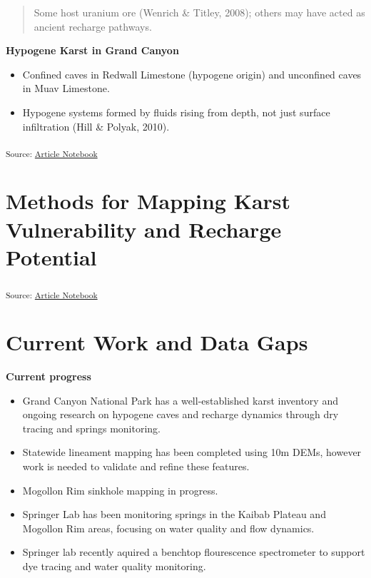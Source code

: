 \documentclass[
]{agujournal2019}
\begin{document}
\begin{quote}
Some host uranium ore (Wenrich \& Titley, 2008); others may have acted
as ancient recharge pathways.
\end{quote}

\textbf{Hypogene Karst in Grand Canyon}

\begin{itemize}
\item
  Confined caves in Redwall Limestone (hypogene origin) and unconfined
  caves in Muav Limestone.
\item
  Hypogene systems formed by fluids rising from depth, not just surface
  infiltration (Hill \& Polyak, 2010).
\end{itemize}

\textsubscript{Source:
\href{https://Ryan3Lima.github.io/ATUR-KARST/index.ipynb.html}{Article
Notebook}}

\section{Methods for Mapping Karst Vulnerability and Recharge
Potential}\label{methods-for-mapping-karst-vulnerability-and-recharge-potential}

\textsubscript{Source:
\href{https://Ryan3Lima.github.io/ATUR-KARST/index.ipynb.html}{Article
Notebook}}

\section{Current Work and Data Gaps}\label{current-work-and-data-gaps}

\textbf{Current progress}

\begin{itemize}
\item
  Grand Canyon National Park has a well-established karst inventory and
  ongoing research on hypogene caves and recharge dynamics through dry
  tracing and springs monitoring.
\item
  Statewide lineament mapping has been completed using 10m DEMs, however
  work is needed to validate and refine these features.
\item
  Mogollon Rim sinkhole mapping in progress.
\item
  Springer Lab has been monitoring springs in the Kaibab Plateau and
  Mogollon Rim areas, focusing on water quality and flow dynamics.
\item
  Springer lab recently aquired a benchtop flourescence spectrometer to
  support dye tracing and water quality monitoring.
\end{itemize}
\end{document}
